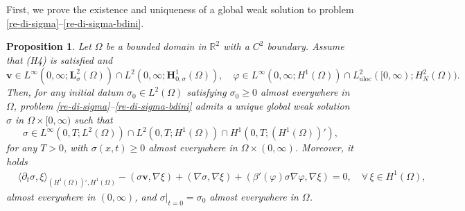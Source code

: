 \documentclass[11pt,reqno]{amsart}
\newtheorem{proposition}{\textbf{Proposition}}[section]
\def\l{\langle}
\def\r{\rangle}
\def\H{\bm{H}}
\def\L{\bm{L}}
\def\vv{\bm{v}}
\begin{document}
First, we prove the existence and uniqueness of a global weak solution to problem
\eqref{re-di-sigma}--\eqref{re-di-sigma-bdini}.
%
\begin{proposition}
\label{sigma-weak}
Let $\Omega$ be a bounded domain in $\mathbb{R}^2$ with a $C^2$ boundary.
Assume that (H4) is satisfied and
$$
\vv \in L^{\infty}(0,\infty;\L^2_{\sigma}(\Omega))\cap L^2(0,\infty;\H^1_{0,\sigma}(\Omega)),\quad
\varphi \in L^\infty(0,\infty;H^1(\Omega))\cap L^2_{\mathrm{uloc}}([0,\infty);H^2_N(\Omega)).
$$
Then, for any initial datum $\sigma_0 \in L^2(\Omega)$ satisfying $\sigma_0 \geq 0$ almost everywhere in $\Omega$, problem \eqref{re-di-sigma}--\eqref{re-di-sigma-bdini} admits a unique global weak  solution $\sigma$ in $\Omega\times [0,\infty)$ such that
\begin{equation}
\label{REG1-w}
\sigma \in L^{\infty}(0,T;L^2(\Omega)) \cap L^2(0,T; H^1(\Omega))\cap H^1(0,T;(H^1(\Omega))'),
\end{equation}
%
for any $T>0$,  with $\sigma(x,t)\geq 0$ almost everywhere in $\Omega \times (0,\infty)$.
Moreover, it holds
%
\begin{align}
&\l \partial_t \sigma, \xi\r_{(H^1(\Omega))',H^1(\Omega)}
-(\sigma\vv, \nabla \xi)+ (\nabla \sigma, \nabla\xi)
+ \left( \beta'(\varphi)\sigma \nabla \varphi, \nabla \xi\right)=0,
\quad \forall\, \xi \in H^1(\Omega),
\label{sig-weak2-w}
\end{align}
%
almost everywhere in $(0,\infty)$, and  $\sigma|_{t=0}=\sigma_{0}$ almost everywhere in $\Omega$.
\end{proposition}
%
\end{document}
